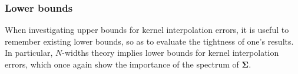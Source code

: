 \documentclass[twoside,11pt]{book}
\DeclareMathOperator{\X}{\mathcal{X}}
\newcommand{\pc}[1]{\textcolor{blue}{#1}}
\newcommand{\rb}[1]{\textcolor{magenta}{#1}}
\begin{document}
%



\subsubsection{Lower bounds}\label{sec:lower_bounds}
When investigating upper bounds for kernel interpolation errors, it is useful to remember existing lower bounds, so as to evaluate the tightness of one's results. In particular, $N$-widths theory \citep{Pin12} implies lower bounds for kernel interpolation errors, which once again show the importance of the spectrum of $\bm{\Sigma}$.
\end{document}
